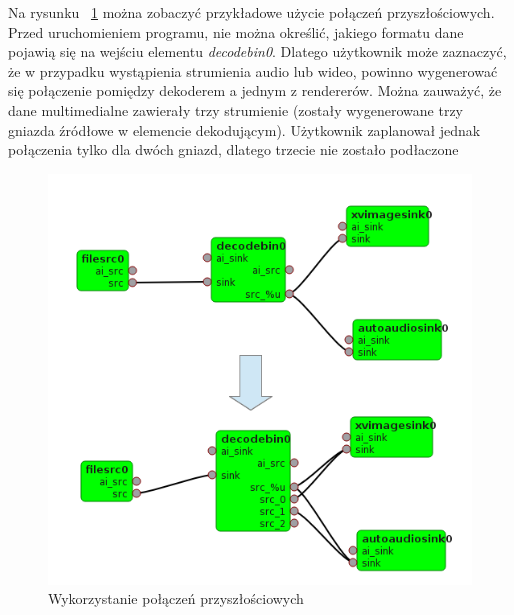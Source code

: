 \documentclass[12pt]{article}
\begin{document}
\begin{itemize}
Na rysunku ~\ref{fig:futureConnections} można zobaczyć przykładowe użycie połączeń przyszłościowych. Przed uruchomieniem programu, nie można określić, jakiego formatu dane pojawią się na wejściu elementu \textit{decodebin0}. Dlatego użytkownik może zaznaczyć, że w przypadku wystąpienia strumienia audio lub wideo, powinno wygenerować się połączenie pomiędzy dekoderem a jednym z rendererów. Można zauważyć, że dane multimedialne zawierały trzy strumienie (zostały wygenerowane trzy gniazda źródłowe w elemencie dekodującym). Użytkownik zaplanował jednak połączenia tylko dla dwóch gniazd, dlatego trzecie nie zostało podłaczone\\
\begin{figure}[H]
  \includegraphics[width=14cm]{img/future-connections.png}
  \caption{Wykorzystanie połączeń przyszłościowych}
  \label{fig:futureConnections}
\end{figure}


\end{itemize}
\end{document}
